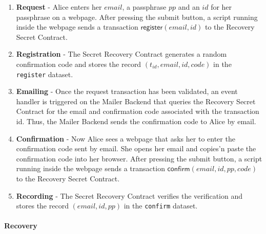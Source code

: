 \documentclass[12pt]{article}
\newcommand{\ms}[1]{\ensuremath{\mathsf{#1}}}
\begin{document}
\begin{enumerate} 
\item {\bf Request} - Alice enters her $email$, a passphrase $pp$ and an $id$ for her passphrase on a webpage. After pressing the submit button, a script running inside the webpage sends a transaction {\bf $\ms{register}(email, id)$} to the Recovery Secret Contract. 
\item {\bf Registration} - The Secret Recovery Contract generates a random confirmation code and stores the record $(t_{id}, email, id, code)$ in the {\tt register} dataset. 
\item {\bf Emailing} - Once the request transaction has been validated, an event handler is triggered on the Mailer Backend that queries the Recovery Secret Contract for the email and confirmation code associated with the transaction id. Thus, the Mailer Backend sends the confirmation code to Alice by email. 
\item {\bf Confirmation} - Now Alice sees a webpage that asks her to enter the confirmation code sent by email. She opens her email and copies'n paste the confirmation code into her browser. After pressing the submit button, a script running inside the webpage sends a transaction $\ms{confirm}(email, id, pp, code)$ to the Recovery Secret Contract. 
\item {\bf Recording} - The Secret Recovery Contract verifies the verification and stores the record $(email, id, pp)$ in the {\tt confirm} dataset. 
\end{enumerate}

\paragraph{Recovery}
\end{document}

